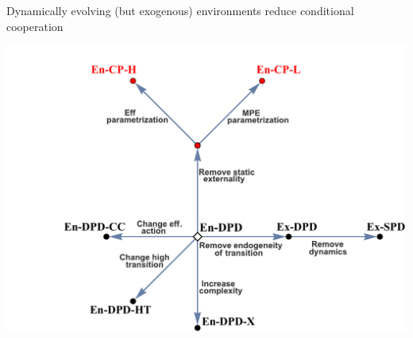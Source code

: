 \documentclass{beamer}
\begin{document}
\begin{frame}
\begin{card}[Result 6]
Dynamically evolving (but exogenous) environments reduce conditional
cooperation
\end{card}
\end{frame}

\begin{frame}
\begin{card}
\begin{center}\includegraphics[height=0.7\textwidth]{./i/FlowChart7.pdf}
\end{center}
\end{card}
\end{frame}
\end{document}
